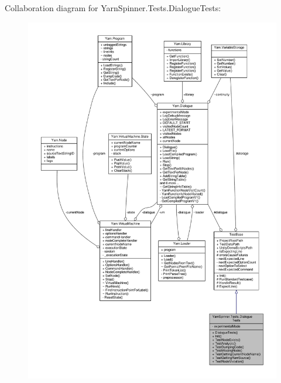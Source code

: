 Collaboration diagram for Yarn\-Spinner.\-Tests.\-Dialogue\-Tests\-:
\nopagebreak
\begin{figure}[H]
\begin{center}
\leavevmode
\includegraphics[width=350pt]{a00799}
\end{center}
\end{figure}
